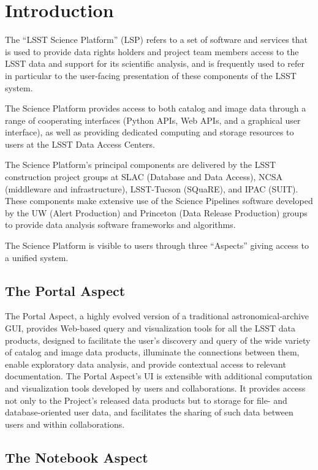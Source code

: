 \section{Introduction}\label{introduction}

The ``LSST Science Platform'' (LSP) refers to a set of software and services that is used to provide data rights holders and project team members access to the LSST data and support for its scientific analysis, and is frequently used to refer in particular to the user-facing presentation of these components of the LSST system.

The Science Platform provides access to both catalog and image data through a range of cooperating interfaces (Python APIs, Web APIs, and a graphical user interface), as well as providing dedicated computing and storage resources to users at the LSST Data Access Centers.

The Science Platform's principal components are delivered by the LSST construction project groups at SLAC (Database and Data Access), NCSA (middleware and infrastructure), LSST-Tucson (SQuaRE), and IPAC (SUIT).  These components make extensive use of the Science Pipelines software developed by the UW (Alert Production) and Princeton (Data Release Production) groups to provide data analysis software frameworks and algorithms.

The Science Platform is visible to users through three ``Aspects'' giving access to a unified system.


\subsection{The Portal Aspect}\label{portal-aspect-intro}

The Portal Aspect, a highly evolved version of a traditional astronomical-archive GUI, provides Web-based query and visualization tools for all the LSST data products, designed to facilitate the user's discovery and query of the wide variety of catalog and image data products, illuminate the connections between them, enable exploratory data analysis, and provide contextual access to relevant documentation.
The Portal Aspect's UI is extensible with additional computation and visualization tools developed by users and collaborations.
It provides access not only to the Project's released data products but to storage for file- and database-oriented user data, and facilitates the sharing of such data between users and within collaborations.

\subsection{The Notebook Aspect}\label{notebook-aspect-intro}

